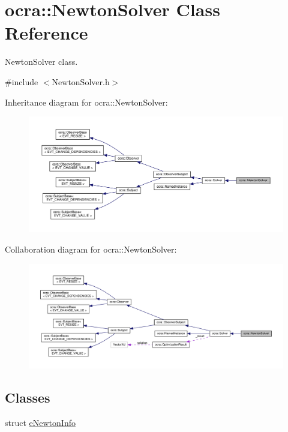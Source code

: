 \hypertarget{classocra_1_1NewtonSolver}{}\section{ocra\+:\+:Newton\+Solver Class Reference}
\label{classocra_1_1NewtonSolver}


Newton\+Solver class.  




{\ttfamily \#include $<$Newton\+Solver.\+h$>$}



Inheritance diagram for ocra\+:\+:Newton\+Solver\+:
\nopagebreak
\begin{figure}[H]
\begin{center}
\leavevmode
\includegraphics[width=350pt]{d6/d0b/classocra_1_1NewtonSolver__inherit__graph}
\end{center}
\end{figure}


Collaboration diagram for ocra\+:\+:Newton\+Solver\+:
\nopagebreak
\begin{figure}[H]
\begin{center}
\leavevmode
\includegraphics[width=350pt]{d4/d73/classocra_1_1NewtonSolver__coll__graph}
\end{center}
\end{figure}
\subsection*{Classes}
\begin{DoxyCompactItemize}
\item 
struct \hyperlink{structocra_1_1NewtonSolver_1_1eNewtonInfo}{e\+Newton\+Info}
\end{DoxyCompactItemize}
